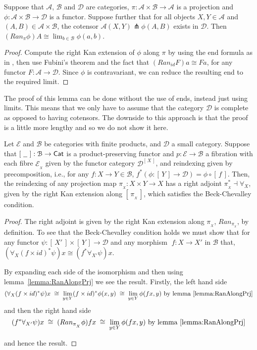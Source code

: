 \documentclass[a4paper,UKenglish]{lipics}
\newcommand{\msf}[1]{\mathsf{#1}} %
\newcommand{\Cat}{\msf{Cat}}
\newcommand{\A}{\mathcal{A}}
\newcommand{\B}{\mathcal{B}}
\newcommand{\D}{\mathcal{D}}
\newcommand{\E}{\mathcal{E}}
\newcommand{\fibreE}[1]{\E_{_{#1}}}
\newcommand{\blank}{\, \underline{\hspace{2mm}} \,}
\newcommand{\SqFun}[1][\blank]{[\, #1 \, ]} %
\begin{document}
\begin{lemma}
\label{lemma:RanAlongPrj}
 Suppose that $\A$, $\B$ and $\D$ are categories, $\pi: \A \times \B \rightarrow \A$ is a projection and $\phi:\A \times \B \rightarrow \mathcal{D}$ is a functor. Suppose further that for all objects $X,Y \in \A$ and $(A,B)\in \A \times \B$, the cotensor $\A(X, Y) \pitchfork \phi (A,B)$ exists in $\mathcal{D}$. Then\;  $(Ran_{\pi}\phi)A \cong \lim_{b\in \B} \phi (a,b)$.

\end{lemma}

\begin{proof}
Compute the right Kan extension of $\phi$ along $\pi$ by using the end formula as in \cite{mac1998categories}, then use Fubini's theorem and the fact that $(Ran_{id} F)a \cong Fa$, for any functor $F: \A\rightarrow \mathcal{D}$. Since $\phi$ is contravariant, we can reduce the resulting end to the required limit.
\end{proof}
The proof of this lemma can be done without the use of ends, instead just using limits. This means that we only have to assume that the category $\mathcal{D}$ is complete as opposed to having cotensors. The downside to this approach is that the proof is a little more lengthy and so we do not show it here.

\begin{theorem}
\label{thm:BC}
Let $\E$ and $\B$ be categories with finite products, and $\mathcal{D}$ a small category. Suppose that $\SqFun : \B \rightarrow \Cat$ is a product-preserving functor and $p:\E\rightarrow \B$ a fibration with each fibre $\fibreE{X}$ given by the functor category $\mathcal{D}^{\SqFun[X]}$, and reindexing given by precomposition, i.e., for any $f:X\rightarrow Y \in \B$, $f^\ast (\phi : \SqFun[Y] \rightarrow \D) = \phi \circ \SqFun[f]$. Then, the reindexing of any projection map $\pi_{_{X}} :X\times Y \rightarrow X $ has a right adjoint $\pi_{_{X}}^\ast \dashv \forall_X$, given by the right Kan extension along $\SqFun[\pi_{_{X}}]$, which satisfies the Beck-Chevalley condition.
\end{theorem}


\begin{proof}
The right adjoint is given by the right Kan extension along $\pi_{_{X}}$, $Ran_{\pi_{_{X}}} $, by definition. To see that the Beck-Chevalley condition holds we must show that for any functor $\psi: \SqFun[X'] \times \SqFun[Y] \rightarrow \D$ and any morphism $\; f:X\rightarrow X'$ in $\B$ that, \; $(\forall_X(f\times id)^\ast \psi)x \cong (f^\ast \forall_{X'} \psi) x$.

By expanding each side of the isomorphism and then using lemma~\ref{lemma:RanAlongPrj} we see the result. Firstly, the left hand side
\[
(\forall_X (f \times id)^\ast \psi)x  \; \cong \; \lim_{y \in Y} (f \times id)^{\ast} \phi (x,y) \; \cong \; \lim_{y\in Y} \phi(fx,y) \text{ by lemma~\ref{lemma:RanAlongPrj}}
\]
and then the right hand side
\[
(f^\ast \forall_{X'} \psi) x  \; \cong \;  (Ran_{\pi_{_{X}}} \phi ) fx \; \cong \;       \lim_{y\in Y} \phi (fx,y) \text{ by lemma~\ref{lemma:RanAlongPrj}}
\]

and hence the result.
\end{proof}
\end{document}
